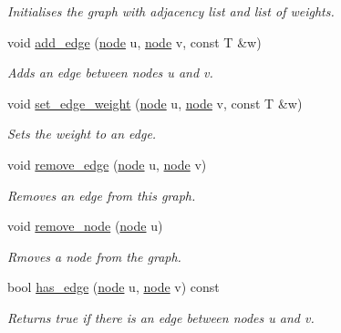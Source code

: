 \begin{DoxyCompactItemize}
\begin{DoxyCompactList}\small\item\em Initialises the graph with adjacency list and list of weights. \end{DoxyCompactList}\item 
void \hyperlink{classlgraph_1_1wdgraph_a2aa52ff1c25ad06a10e243dcb74ce9a2}{add\+\_\+edge} (\hyperlink{namespacelgraph_a397169dd66adf725210a30fb7251773e}{node} u, \hyperlink{namespacelgraph_a397169dd66adf725210a30fb7251773e}{node} v, const T \&w)
\begin{DoxyCompactList}\small\item\em Adds an edge between nodes {\itshape u} and {\itshape v}. \end{DoxyCompactList}\item 
void \hyperlink{classlgraph_1_1wdgraph_a4bc95cc58a1f0d735c1317611f516969}{set\+\_\+edge\+\_\+weight} (\hyperlink{namespacelgraph_a397169dd66adf725210a30fb7251773e}{node} u, \hyperlink{namespacelgraph_a397169dd66adf725210a30fb7251773e}{node} v, const T \&w)
\begin{DoxyCompactList}\small\item\em Sets the weight to an edge. \end{DoxyCompactList}\item 
void \hyperlink{classlgraph_1_1wdgraph_a6bdc75a07568928bc179dde03a814366}{remove\+\_\+edge} (\hyperlink{namespacelgraph_a397169dd66adf725210a30fb7251773e}{node} u, \hyperlink{namespacelgraph_a397169dd66adf725210a30fb7251773e}{node} v)
\begin{DoxyCompactList}\small\item\em Removes an edge from this graph. \end{DoxyCompactList}\item 
void \hyperlink{classlgraph_1_1wdgraph_aa6861b63fccd1def268f3ff84d31da52}{remove\+\_\+node} (\hyperlink{namespacelgraph_a397169dd66adf725210a30fb7251773e}{node} u)
\begin{DoxyCompactList}\small\item\em Rmoves a node from the graph. \end{DoxyCompactList}\item 
bool \hyperlink{classlgraph_1_1wdgraph_a0b0f9b2cec5dbdd7eb84305c588e31c1}{has\+\_\+edge} (\hyperlink{namespacelgraph_a397169dd66adf725210a30fb7251773e}{node} u, \hyperlink{namespacelgraph_a397169dd66adf725210a30fb7251773e}{node} v) const
\begin{DoxyCompactList}\small\item\em Returns true if there is an edge between nodes {\itshape u} and {\itshape v}. \end{DoxyCompactList}\item 

\end{DoxyCompactItemize}

